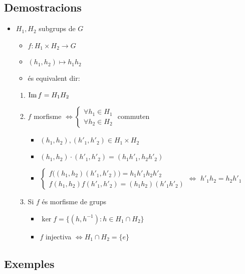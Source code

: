 \subsection*{Demostracions}
\begin{itemize}
\item $H_1, H_2$ subgrups de $G$
	\begin{itemize}
	\item $f: H_1 \times H_2 \to G$
	\item $(h_1, h_2) \mapsto h_1h_2$
	\item és equivalent dir:
	\end{itemize}
	\begin{enumerate}
	\item $\operatorname{Im} f = H_1 H_2$
	\item $f$ morfisme $\Leftrightarrow
		\begin{cases}
		\forall h_1 \in H_1\\
		\forall h_2 \in H_2
		\end{cases}
		$ commuten
		\begin{itemize}
		\item $(h_1, h_2),(h'_1, h'_2) \in H_1 \times H_2$
		\item $(h_1, h_2)\cdot(h'_1, h'_2) = (h_1h'_1, h_2h'_2)$
		\item
			$
			\begin{cases}
			f\big((h_1, h_2)(h'_1, h'_2)\big) = h_1h'_1h_2h'_2\\
			f(h_1, h_2)f(h'_1, h'_2) = (h_1h_2)(h'_1h'_2)
			\end{cases} \Leftrightarrow
			$
			\subitem $h'_1h_2 = h_2h'_1$
		\end{itemize}
	\item Si $f$ és morfisme de grups
		\begin{itemize}
		\item $\ker f = \{(h, h^{-1}): h \in H_1 \cap H_2\}$
		\item $f$ injectiva $\Leftrightarrow H_1 \cap H_2 = \{e\}$
		\end{itemize}
	\end{enumerate}
\end{itemize}
\subsection*{Exemples}
